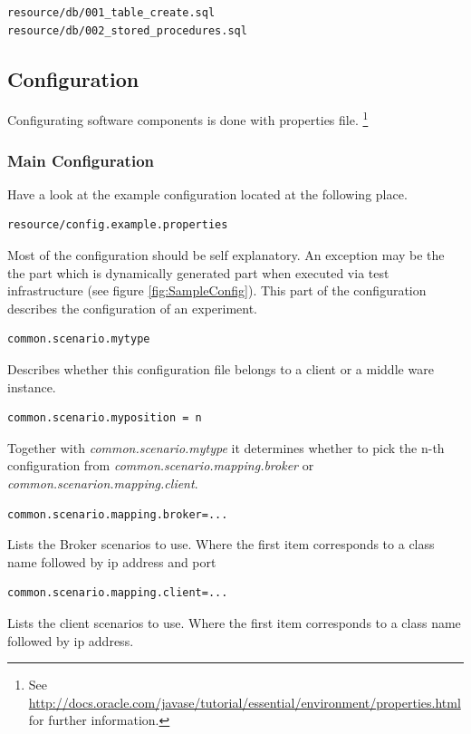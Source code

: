 \documentclass[a4paper]{article}
\begin{document}
\begin{verbatim} 
resource/db/001_table_create.sql
resource/db/002_stored_procedures.sql
\end{verbatim}

\subsection{Configuration}
Configurating software components is done with properties file. \footnote{See \url{http://docs.oracle.com/javase/tutorial/essential/environment/properties.html} for further information.}
\subsubsection{Main Configuration}
\label{subsub:MainConfig}

Have a look at the example configuration located at the following place.

\begin{verbatim} 
resource/config.example.properties
\end{verbatim}

Most of the configuration should be self explanatory. An exception may be the the part which is dynamically generated part when executed via test infrastructure (see figure \ref{fig:SampleConfig}). This part of the configuration describes the configuration of an experiment.

\begin{verbatim} 
common.scenario.mytype
\end{verbatim}
Describes whether this configuration file belongs to a client or a middle ware instance.

\begin{verbatim} 
common.scenario.myposition = n
\end{verbatim}
Together with \textit{common.scenario.mytype} it determines whether to pick the n-th configuration from\textit{ common.scenario.mapping.broker} or \textit{common.scenarion.mapping.client}.

\begin{verbatim} 
common.scenario.mapping.broker=...
\end{verbatim}
Lists the Broker scenarios to use. Where the first item corresponds to a class name followed by ip address and port

\begin{verbatim} 
common.scenario.mapping.client=...
\end{verbatim}
Lists the client scenarios to use. Where the first item corresponds to a class name followed by ip address.
\end{document}
